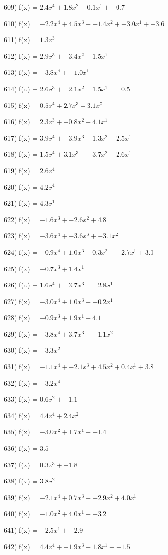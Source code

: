 \documentclass[10pt,a4paper]{article}
\begin{document}
609) f(x) = $2.4x^4 + 1.8x^2 + 0.1x^1 + -0.7$

610) f(x) = $-2.2x^4 + 4.5x^3 + -1.4x^2 + -3.0x^1 + -3.6$

611) f(x) = $1.3x^3$

612) f(x) = $2.9x^3 + -3.4x^2 + 1.5x^1$

613) f(x) = $-3.8x^4 + -1.0x^1$

614) f(x) = $2.6x^3 + -2.1x^2 + 1.5x^1 + -0.5$

615) f(x) = $0.5x^4 + 2.7x^3 + 3.1x^2$

616) f(x) = $2.3x^3 + -0.8x^2 + 4.1x^1$

617) f(x) = $3.9x^4 + -3.9x^3 + 1.3x^2 + 2.5x^1$

618) f(x) = $1.5x^4 + 3.1x^3 + -3.7x^2 + 2.6x^1$

619) f(x) = $2.6x^4$

620) f(x) = $4.2x^4$

621) f(x) = $4.3x^1$

622) f(x) = $-1.6x^3 + -2.6x^2 + 4.8$

623) f(x) = $-3.6x^4 + -3.6x^3 + -3.1x^2$

624) f(x) = $-0.9x^4 + 1.0x^3 + 0.3x^2 + -2.7x^1 + 3.0$

625) f(x) = $-0.7x^3 + 1.4x^1$

626) f(x) = $1.6x^4 + -3.7x^3 + -2.8x^1$

627) f(x) = $-3.0x^4 + 1.0x^3 + -0.2x^1$

628) f(x) = $-0.9x^3 + 1.9x^1 + 4.1$

629) f(x) = $-3.8x^4 + 3.7x^3 + -1.1x^2$

630) f(x) = $-3.3x^2$

631) f(x) = $-1.1x^4 + -2.1x^3 + 4.5x^2 + 0.4x^1 + 3.8$

632) f(x) = $-3.2x^4$

633) f(x) = $0.6x^2 + -1.1$

634) f(x) = $4.4x^4 + 2.4x^2$

635) f(x) = $-3.0x^2 + 1.7x^1 + -1.4$

636) f(x) = $3.5$

637) f(x) = $0.3x^3 + -1.8$

638) f(x) = $3.8x^2$

639) f(x) = $-2.1x^4 + 0.7x^3 + -2.9x^2 + 4.0x^1$

640) f(x) = $-1.0x^2 + 4.0x^1 + -3.2$

641) f(x) = $-2.5x^1 + -2.9$

642) f(x) = $4.4x^4 + -1.9x^3 + 1.8x^1 + -1.5$
\end{document}
